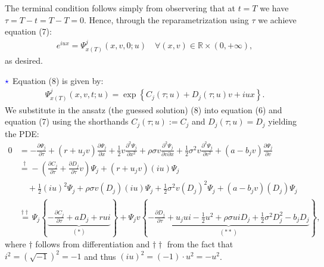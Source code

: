 \documentclass[11pt]{article}
\numberwithin{equation}{section}
\newcommand{\lc}{\left\{}
\newcommand{\rc}{\right\}}
\begin{document}
The terminal condition follows simply from observering that at $t=T$
we have $\tau=T-t=T-T=0$. Hence, through the reparametrization using $\tau$ we
achieve equation (7):
\begin{align*}
    e^{iux}=\Psi_{x(T)}^j(x,v,0;u) \quad \forall (x, v) \in \mathbb{R} \times (0, +\infty),
\end{align*}
as desired.

\newpage
$\textcolor{blue}{\star}$ Equation (8) is given by:
\begin{align*}
    \Psi_{x(T)}^j(x,v,t;u)=\exp \lc C_j (\tau; u) + D_j (\tau; u)v + i  u x \rc.
\end{align*}
We substitute in the ansatz (the guessed solution) (8) into equation (6) and equation (7) using the shorthands
$C_j (\tau; u):=C_j$ and $D_j (\tau; u)=D_j$ yielding the PDE:
\begin{align*}
    0&=-\frac{\partial \Psi_j}{\partial \tau}+(r+u_jv)\frac{\partial \Psi_j}{\partial x}+
    \frac{1}{2}v\frac{\partial^2 \Psi_j}{\partial x^2}+\rho\sigma v \frac{\partial^2 \Psi_j}{\partial v \partial x}+
    \frac{1}{2}\sigma^2v \frac{\partial^2 \Psi_j}{\partial v^2}+(a-b_j v) \frac{\partial \Psi_j}{\partial v}\\
    &\overset{\dagger}{=}-\left( \frac{\partial  C_j}{\partial \tau}+ \frac{\partial D_j}{\partial \tau}v\right)\Psi_j +(r+u_jv)(iu) \Psi_j\\&\quad+ \frac{1}{2}(iu)^2\Psi_j+\rho\sigma v(D_j)(iu)\Psi_j+
    \frac{1}{2}\sigma^2v (D_j)^2\Psi_j+(a-b_j v)( D_j)\Psi_j\\
    &\overset{\dagger\dagger}{=} \Psi_j \lc \underbrace{ -\frac{\partial C_j}{\partial \tau} +aD_j+rui}_{(*)} \rc + \Psi_j v \lc\underbrace{ -\frac{\partial D_j}{\partial \tau}+u_jui-\frac{1}{2}u^2+\rho\sigma u i D_j+\frac{1}{2}\sigma^2 D_j^2 - b_jD_j}_{(**)} \rc,
\end{align*}
where $\dagger$ follows from differentiation and
$\dagger \dagger$ from the fact that $i^2= (\sqrt{-1})^2=-1$ and thus
$(iu)^2=(-1 )\cdot u^2=-u^2$.
\end{document}
